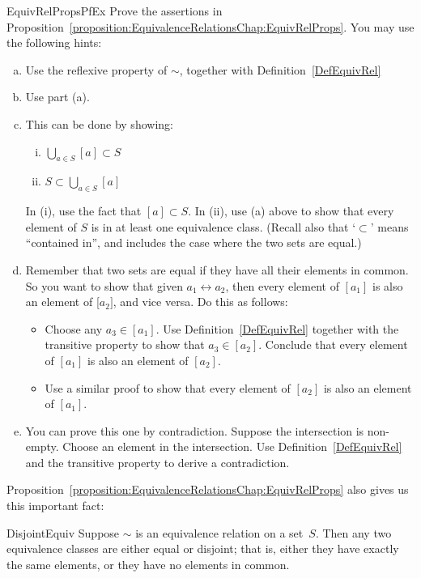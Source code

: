 \begin{exercise}{EquivRelPropsPfEx}
Prove the assertions in Proposition~\ref{proposition:EquivalenceRelationsChap:EquivRelProps}. You may use the following hints:
\begin{enumerate}[(a)]
\item
Use the reflexive property of $\sim$, together with Definition~\ref{DefEquivRel}
\item
Use part (a).
\item
This can be done by showing:
\begin{enumerate}[(i)]
\item 
$\bigcup_{a \in S} [a] \subset S$
\item
$S \subset \bigcup_{a \in S} [a]$
\end{enumerate}
In (i), use the fact that $[a] \subset S$.  In (ii), use (a) above to show that every element of $S$ is in at least one equivalence class. (Recall also that `$\subset$' means ``contained in'', and  includes the case where the two sets are equal.)
\item
Remember that two sets are equal if they have all their elements in common. So you want to show that given $a_1 \rel a_2$, then every element of $[a_1]$ is also an element of [$a_2]$, and vice versa. Do this as follows: 
\begin{itemize}
\item
Choose any $a_3 \in [a_1]$. Use Definition~\ref{DefEquivRel} together with the transitive property to show that $a_3 \in [a_2]$. Conclude that every element of $[a_1]$ is also an element of $[a_2]$. 
\item
Use a similar proof to show that every element of $[a_2]$ is also an element of $[a_1]$.
\end{itemize}
\item
You can prove this one by contradiction. Suppose the intersection is non-empty. Choose an element in the intersection. Use Definition~\ref{DefEquivRel} and the transitive property to derive a contradiction.
\end{enumerate}
\end{exercise}

Proposition~\ref{proposition:EquivalenceRelationsChap:EquivRelProps} also gives us this important fact:

\begin{prop}{DisjointEquiv}
Suppose $\sim$ is an equivalence relation on a set~$S$. Then any two equivalence classes are either equal or disjoint; that is, either they have exactly the same elements, or they have no elements in common. 
\end{prop}

